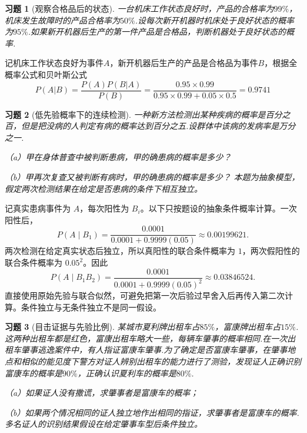 \documentclass[UTF8,12pt,a4paper,fontset=fandol]{ctexart}
\newtheorem{exercise}{习题}[section]
\begin{document}
\begin{exercise}[观察合格品后的状态]\label{q:Y2.22}
一台机床工作状态良好时，产品的合格率为$99\%$，机床发生故障时的产品合格率为$50\%$.设每次新开机器时机床处于良好状态的概率为$95\%$.如果新开机器后生产的第一件产品是合格品，判断机器处于良好状态的概率.\par{}
\end{exercise}

\begin{solve}\label{a:Y2.22}
记机床工作状态良好为事件$A$，新开机器后生产的产品是合格品为事件$B$，根据全概率公式和贝叶斯公式
\[P(A|B) = \frac{{P(A)P(B|A)}}{{P(B)}} = \frac{{0.95 \times 0.99}}{{0.95 \times 0.99 + 0.05 \times 0.5}} = 0.9741\]
\end{solve}

\begin{exercise}[低先验概率下的连续检测]\label{q:Y2.23}
一种新方法检测出某种疾病的概率是百分之百，但是把没病的人判定有病的概率达到百分之五.设群体中该病的发病率是万分之一.

（a）甲在身体普查中被判断患病，甲的确患病的概率是多少？

（b）甲再次复查又被判断有病时，甲的确患病的概率是多少？ 本题为抽象模型，假定两次检测结果在给定是否患病的条件下相互独立。\par{}
\end{exercise}

\begin{solve}\label{a:Y2.23}记真实患病事件为 $A$，每次阳性为 $B_i$。以下只按题设的抽象条件概率计算。一次阳性后，\[P(A\mid B_1)=\frac{0.0001}{0.0001+0.9999(0.05)}\approx0.00199621.\]两次检测在给定真实状态后独立，所以真阳性的联合条件概率为 $1$，两次假阳性的联合条件概率为 $0.05^2$。因此\[P(A\mid B_1B_2)=\frac{0.0001}{0.0001+0.9999(0.05)^2}\approx0.03846524.\]直接使用原始先验与联合似然，可避免把第一次后验过早舍入后再传入第二次计算。条件独立与无条件独立不是同一假设。\end{solve}

\begin{exercise}[目击证据与先验比例]\label{q:Y2.25}
某城市夏利牌出租车占$85\%$，富康牌出租车占$15\%$.这两种出租车都是红色，富康出租车略大一些，每辆车肇事的概率相同.在一次出租车肇事逃逸案件中，有人指证富康车肇事.为了确定是否富康车肇事，在肇事地点和相似的能见度下警方对证人辨别出租车的能力进行了测验，发现证人正确识别富康车的概率是$90\%$，正确认识夏利车的概率是$80\%$.

（a）如果证人没有撒谎，求肇事者是富康车的概率；

（b）如果两个情况相同的证人独立地作出相同的指证，求肇事者是富康车的概率. 多名证人的识别结果假设在给定肇事车型后条件独立。\par{}
\end{exercise}
\end{document}
